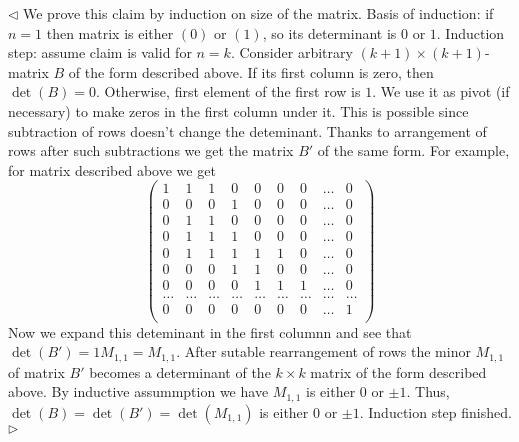 \documentclass[12pt]{article}
\newenvironment{solution}{\par $\triangleleft$}{$\triangleright$}
\begin{document}
\begin{solution}
We prove this claim by induction on size of the matrix. Basis of induction: if $n=1$ then matrix is either $(0)$ or $(1)$, so its determinant is $0$ or $1$. Induction step: assume claim is valid for $n=k$. Consider arbitrary  $(k+1)\times(k+1)$-matrix $B$ of the form described above. If its first column is zero, then $\det(B)=0$. Otherwise, first element of the first row is $1$. We use it as pivot (if necessary) to make zeros in the first column under it. This is possible since subtraction of rows doesn't change the deteminant. Thanks to arrangement of rows after such subtractions we get the matrix $B'$ of the same form. For example, for matrix described above we get
$$
\begin{pmatrix}
1      & 1      & 1      & 0      & 0      & 0      & 0      & \ldots & 0      \\
0      & 0     & 0      & 1      & 0      & 0      & 0      & \ldots & 0      \\
0      & 1      & 1      & 0      & 0      & 0      & 0      & \ldots & 0      \\
0      & 1      & 1      & 1      & 0      & 0      & 0      & \ldots & 0      \\
0      & 1      & 1      & 1      & 1      & 1      & 0      & \ldots & 0      \\
0      & 0      & 0      & 1      & 1      & 0      & 0      & \ldots & 0      \\
0      & 0      & 0      & 0      & 1      & 1      & 1      & \ldots & 0      \\
\ldots & \ldots & \ldots & \ldots & \ldots & \ldots & \ldots & \ldots & \ldots \\
0      & 0      & 0      & 0      & 0      & 0      & 0      & \ldots & 1      \\
\end{pmatrix}
$$
Now we expand this deteminant in the first columnn and see that $\det(B')=1 M_{1,1}=M_{1,1}$. After sutable rearrangement of rows the minor $M_{1,1}$ of matrix $B'$ becomes a determinant of the $k\times k$ matrix of the form described above. By inductive assummption we have $M_{1,1}$ is either $0$ or $\pm 1$. Thus, $\det(B)=\det(B')=\det(M_{1,1})$ is either $0$ or $\pm 1$. Induction step finished.
\end{solution}
 
 
 
 
 
 
 
 
 
 
 
\end{document}

